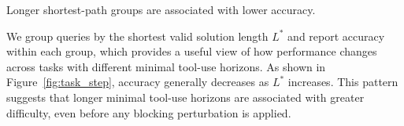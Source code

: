 


\begin{takeaway}[label={tak:analysis-path-length}]
Longer shortest-path groups are associated with lower accuracy.
\end{takeaway}


\noindent We group queries by the shortest valid solution length $L^*$ and report accuracy within each group, which provides a useful view of how performance changes across tasks with different minimal tool-use horizons. 
As shown in Figure~\ref{fig:task_step}, accuracy generally decreases as $L^*$ increases.
This pattern suggests that longer minimal tool-use horizons are associated with greater difficulty, even before any blocking perturbation is applied.


